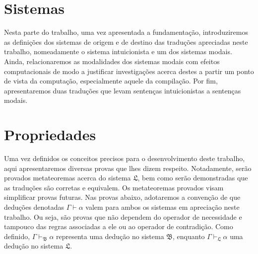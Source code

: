     \tableofcontents

    
    
    

    \chapter{Sistemas}

        Nesta parte do trabalho, uma vez apresentada a fundamentação, introduziremos as definições dos sistemas de origem e de destino das traduções apreciadas neste trabalho, nomeadamente o sistema intuicionista e um dos sistemas modais.
        Ainda, relacionaremos as modalidades dos sistemas modais com efeitos computacionais de modo a justificar investigações acerca destes a partir um ponto de vista da computação, especialmente aquele da compilação.
        Por fim, apresentaremos duas traduções que levam sentenças intuicionistas a sentenças modais.

        
        
        
        

    \chapter{Propriedades}
        Uma vez definidos os conceitos precisos para o desenvolvimento deste trabalho, aqui apresentaremos diversas provas que lhes dizem respeito.
        Notadamente, serão provados metateoremas acerca do sistema $\mathfrak{L}$, bem como serão demonstradas que as traduções são corretas e equivalem.
        Os metateoremas provados visam simplificar provas futuras.
        Nas provas abaixo, adotaremos a convenção de que deduções denotadas $\Gamma\vdash\alpha$ valem para ambos os sistemas em apreciação neste trabalho.
        Ou seja, são provas que não dependem do operador de necessidade e tampouco das regras associadas a ele ou ao operador de contradição.
        Como definido, $\Gamma\vdash_\mathfrak{B}\alpha$ representa uma dedução no sistema $\mathfrak{B}$, enquanto $\Gamma\vdash_\mathfrak{L}\alpha$ uma dedução no sistema $\mathfrak{L}$.

        
        
        
        
        

    
    

